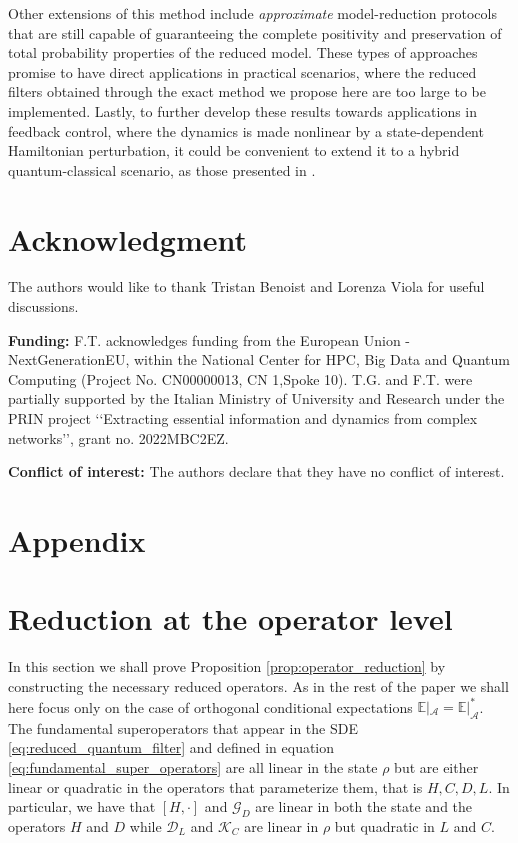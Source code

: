 \documentclass[aihp,12pt]{imsart}
\newcommand{\Dc}{\mathcal{D}}
\newcommand{\Gc}{\mathcal{G}}
\newcommand{\Kc}{\mathcal{K}}
\newcommand{\As}{\mathscr{A}}
\newcommand{\Eb}{\mathbb{E}}
\theoremstyle{theorem}
\theoremstyle{definition}
\theoremstyle{remark}
\begin{document}
Other extensions of this method include {\em approximate} model-reduction protocols that are still capable of guaranteeing the complete positivity and preservation of total probability properties of the reduced model. These types of approaches promise to have direct applications in practical scenarios, where the reduced filters obtained through the exact method we propose here are too large to be implemented. Lastly, to further develop these results towards applications in feedback control, where the dynamics is made nonlinear by a state-dependent Hamiltonian perturbation, it could be convenient to extend it to a hybrid quantum-classical scenario, as those presented in \cite{barchielli2023markovian,barchielli2024hybridquantumclassicalsystemsquasifree}.

\section*{Acknowledgment}
The authors would like to thank Tristan Benoist and Lorenza Viola for useful discussions.

\noindent\textbf{Funding:}
F.T. acknowledges funding from the European Union - NextGenerationEU, within the National Center for HPC, Big Data and Quantum Computing (Project No. CN00000013, CN 1,Spoke 10).
T.G. and F.T. were partially supported by the Italian Ministry of University and Research under the PRIN project ‘‘Extracting essential information and dynamics from complex networks’’, grant  no. 2022MBC2EZ.

\noindent\textbf{Conflict of interest:} The authors declare that they have no conflict of interest. 

 


\section*{Appendix}
\appendix

\section{Reduction at the operator level}
\label{sec:noise_operators_reduction}

In this section we shall prove Proposition \ref{prop:operator_reduction} by constructing the necessary reduced operators. As in the rest of the paper we shall here focus only on the case of orthogonal conditional expectations $\Eb|_\As = \Eb|_{\As}^*$.
The fundamental superoperators that appear in the SDE \eqref{eq:reduced_quantum_filter} and defined in equation \eqref{eq:fundamental_super_operators} are all linear in the state $\rho$ but are either linear or quadratic in the operators that parameterize them, that is $H,C,D,L$. In particular, we have that $[H,\cdot]$ and $\Gc_{D}$ are linear in both the state and the operators $H$ and $D$ while $\Dc_{L}$ and $\Kc_{C}$ are linear in $\rho$ but quadratic in $L$ and $C$. 
\end{document}
